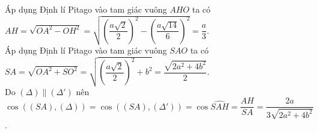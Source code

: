 \begin{ex}
{{\begin{tikzpicture}[line join=round,line cap=round, font=\footnotesize,scale=1,>=stealth]
            \end{tikzpicture}
        }
        \noindent Áp dụng Định lí Pitago vào tam giác vuông $AHO$ ta có\\
        $AH=\sqrt{OA^2-OH^2}=\sqrt{\left(\dfrac{a\sqrt{2}}{2}\right)^2-\left(\dfrac{a\sqrt{14}}{6}\right)^2}=\dfrac{a}{3}$.\\
        Áp dụng Định lí Pitago vào tam giác vuông $SAO$ ta có\\
        $SA=\sqrt{OA^2+SO^2}=\sqrt{\left(\dfrac{a\sqrt{2}}{2}\right)^2+b^2}=\dfrac{\sqrt{2a^2+4b^2}}{2}$.\\
        Do $(\Delta)\parallel(\Delta')$ nên $\cos\left((SA),(\Delta)\right)=\cos\left((SA),(\Delta')\right)=\cos\widehat{SAH}=\dfrac{AH}{SA}=\dfrac{2a}{3\sqrt{2a^2+4b^2}}$.
    }
\end{ex}

